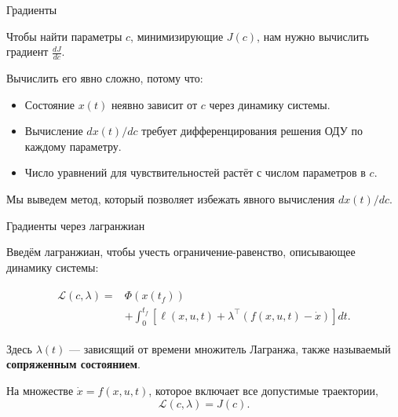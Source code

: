 \documentclass{beamer}
\begin{document}
	\begin{frame}{Градиенты}
		\begin{flushleft}
			Чтобы найти параметры $c$, минимизирующие $J(c)$,
			нам нужно вычислить градиент $\frac{dJ}{dc}$.
			
			\bigskip
			
			Вычислить его явно сложно, потому что:
			\begin{itemize}
				\item Состояние $x(t)$ неявно зависит от $c$
				через динамику системы.
				\item Вычисление $dx(t)/dc$ требует дифференцирования
				решения ОДУ по каждому параметру.
				\item Число уравнений для чувствительностей растёт
				с числом параметров в $c$.
			\end{itemize}
			
			\bigskip
			
			Мы выведем метод, который позволяет избежать явного
			вычисления $dx(t)/dc$.
		\end{flushleft}
	\end{frame}
	
	\begin{frame}{Градиенты через лагранжиан}
		\begin{flushleft}
			Введём лагранжиан, чтобы учесть ограничение-равенство,
			описывающее динамику системы:
			
			\begin{align}
				\boxed{
					\begin{aligned}
						\mathcal{L}(c,\lambda)
						={}&\Phi(x(t_f))\\
						&+\int_0^{t_f}
						\left[
						\ell(x,u,t)+
						\lambda^\top(f(x,u,t)-\dot{x})
						\right]dt.
					\end{aligned}
				}
			\end{align}
			
			\medskip
			
			Здесь $\lambda(t)$ --- зависящий от времени множитель Лагранжа,
			также называемый \textbf{сопряженным состоянием}.
			
			\bigskip
			
			На множестве $\dot{x}=f(x,u,t)$, которое включает все
			допустимые траектории,
			\[
			\boxed{\mathcal{L}(c,\lambda)=J(c).}
			\]
		\end{flushleft}
	\end{frame}
	
\end{document}

